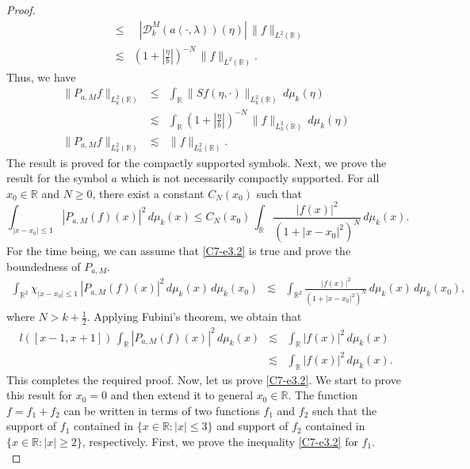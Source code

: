 \documentclass[12pt,a4paper,reqno]{amsproc}
\theoremstyle{definition}
\theoremstyle{remark}
\numberwithin{equation}{section}
\begin{document}
\begin{proof}
\begin{eqnarray*}
    &\le&  \mathop{\underset{\eta
 \in \mathbb{R}}{\text{sup}}}|\mathcal{D}_k^M(a(\cdot,\lambda))(\eta)|\,\|f\|_{L^2(\mathbb{R})}\\
 &\lesssim& \left(1+ \left|\frac{\eta}{b} \right|\right)^{-N}\,\|f\|_{L^2(\mathbb{R})}.
 \end{eqnarray*}
 Thus, we have
 \begin{eqnarray*}
 \|P_{a,M}f\|_{L_k^2(\mathbb{R})} &\le& \int_{\mathbb{R}}\|Sf(\eta,\cdot)\|_{L_k^2(\mathbb{R})}\,d\mu_k(\eta)\\
 &\lesssim& \int_{\mathbb{R}}\left(1+ \left|\frac{\eta}{b} \right|\right)^{-N}\,\|f\|_{L_k^2(\mathbb{R})}\,d\mu_k(\eta)\\
\|P_{a,M}f\|_{L_k^2(\mathbb{R})} &\lesssim&  \|f\|_{L_k^2(\mathbb{R})}.
 \end{eqnarray*}
 The result is proved for the compactly supported symbols. Next, we prove the result for the symbol $a$ which is not necessarily compactly supported.  For all $x_0 \in \mathbb{R}$ and $ N\ge0$,  there exist a constant $C_N(x_0
 )$ such that
 \begin{equation}\label{C7-e3.2}
\int_{|x-x_0| \le 1} |P_{a,M}(f)(x)|^2\,d\mu_k(x) \le  C_N(x_0
 )\, \int_{\mathbb{R}}\frac{|f(x)|^2}{(1+|x-x_0|^2)^N}\,d\mu_k(x).  
 \end{equation}
For the time being, we can assume that \eqref{C7-e3.2} is true and prove the boundedness of $P_{a,M}$.
\begin{eqnarray*}
    \int_{\mathbb{R}^2} \chi_{|x-x_0|\le 1}\, |P_{a,M}(f)(x)|^2\,d\mu_k(x)\,d\mu_k(x_0) &\lesssim& \int_{\mathbb{R}^2}  \frac{|f(x)|^2}{(1+|x-x_0|^2)^N}\,d\mu_k(x)\,d\mu_k(x_0), \end{eqnarray*}
    where $N >k+\frac{1}{2}$. Applying Fubini's theorem, we obtain that
\begin{eqnarray*}
l(\left[x-1,x+1\right])\,\int_{\mathbb{R}} |P_{a,M}(f)(x)|^2\,d\mu_k(x) &\lesssim& \int_{\mathbb{R}} |f(x)|^2\, d\mu_k(x)\\
&\lesssim& \int_{\mathbb{R}} |f(x)|^2\, d\mu_k(x).
\end{eqnarray*}
This completes the required proof. Now, let us 
  prove \eqref{C7-e3.2}. We start to prove this result for $x_0=0$ and then extend it to general $x_0\in \mathbb{R}$. The function $f=f_1+f_2$ can be written in terms of two functions $f_1$ and $f_2$ such that the support of $f_1$ contained in $\{x \in \mathbb{R}: |x|\le 3\}$ and support of $f_2$ contained in $\{x \in \mathbb{R}: |x|\ge 2\}$, respectively.  First, we prove the inequality  \eqref{C7-e3.2} for $f_1$.\\

\end{proof}
\end{document}
